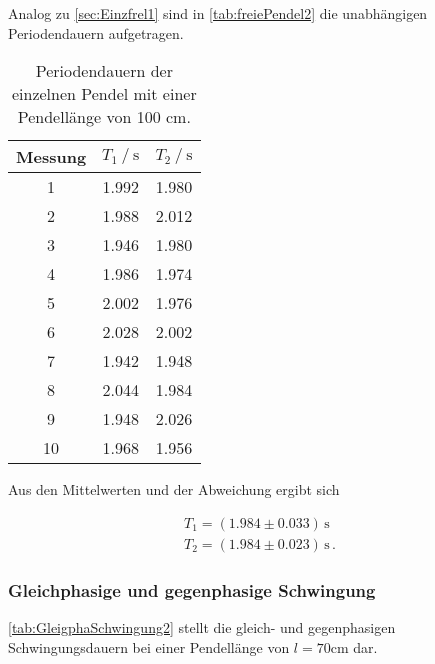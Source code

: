 Analog zu \autoref{sec:Einzfrel1} sind in \autoref{tab:freiePendel2} die unabhängigen Periodendauern aufgetragen.
\begin{table}[H]
  \centering
  \caption{Periodendauern der einzelnen Pendel mit einer Pendellänge von 100 cm.}
  \label{tab:freiePendel2}
  \begin{tabular}{S[table-format=2.0] S S}
    \toprule
    {Messung} & {$T_1 \mathbin{/} \unit{\second}$} & {$T_2 \mathbin{/} \unit{\second}$} \\
     & 1.992 & 1.980 \\
    2 & 1.988 & 2.012 \\
    3 & 1.946 & 1.980 \\
    4 & 1.986 & 1.974 \\
    5 & 2.002 & 1.976 \\
    6 & 2.028 & 2.002 \\
    7 & 1.942 & 1.948 \\
    8 & 2.044 & 1.984 \\
    9 & 1.948 & 2.026 \\
   10 & 1.968 & 1.956 \\
    \bottomrule
  \end{tabular}
\end{table}

Aus den Mittelwerten und der Abweichung ergibt sich 

\begin{align*}
  T_1 = (1.984 \pm 0.033) \, \unit{\second} \\
  T_2 = (1.984 \pm 0.023) \, \unit{\second} \,.
\end{align*}

\subsubsection{Gleichphasige und gegenphasige Schwingung}

\autoref{tab:GleigphaSchwingung2} stellt die gleich- und gegenphasigen Schwingungsdauern bei einer Pendellänge von $l=70 \unit{\centi\meter}$ dar.

